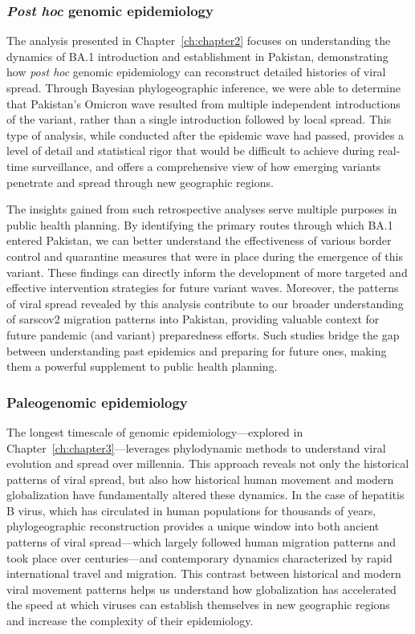 \subsubsection{\textit{Post hoc} genomic epidemiology}
The analysis presented in Chapter~\ref{ch:chapter2} focuses on understanding the dynamics of BA.1 introduction and establishment in Pakistan, demonstrating how \textit{post hoc} genomic epidemiology can reconstruct detailed histories of viral spread.
Through Bayesian phylogeographic inference, we were able to determine that Pakistan's Omicron wave resulted from multiple independent introductions of the variant, rather than a single introduction followed by local spread.
This type of analysis, while conducted after the epidemic wave had passed, provides a level of detail and statistical rigor that would be difficult to achieve during real-time surveillance, and offers a comprehensive view of how emerging variants penetrate and spread through new geographic regions.

The insights gained from such retrospective analyses serve multiple purposes in public health planning.
By identifying the primary routes through which BA.1 entered Pakistan, we can better understand the effectiveness of various border control and quarantine measures that were in place during the emergence of this variant.
These findings can directly inform the development of more targeted and effective intervention strategies for future variant waves.
Moreover, the patterns of viral spread revealed by this analysis contribute to our broader understanding of \gls{sarscov2} migration patterns into Pakistan, providing valuable context for future pandemic (and variant) preparedness efforts.
Such studies bridge the gap between understanding past epidemics and preparing for future ones, making them a powerful supplement to public health planning.

\subsubsection{Paleogenomic epidemiology}
The longest timescale of genomic epidemiology---explored in Chapter~\ref{ch:chapter3}---leverages phylodynamic methods to understand viral evolution and spread over millennia.
This approach reveals not only the historical patterns of viral spread, but also how historical human movement and modern globalization have fundamentally altered these dynamics.
In the case of hepatitis B virus, which has circulated in human populations for thousands of years, phylogeographic reconstruction provides a unique window into both ancient patterns of viral spread---which largely followed human migration patterns and took place over centuries---and contemporary dynamics characterized by rapid international travel and migration.
This contrast between historical and modern viral movement patterns helps us understand how globalization has accelerated the speed at which viruses can establish themselves in new geographic regions and increase the complexity of their epidemiology.

